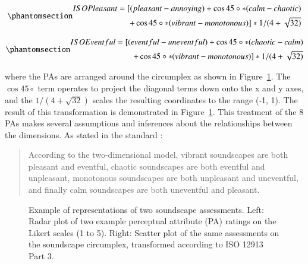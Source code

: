 \documentclass[
  authoryear,
  preprint,
  3p]{elsarticle}
\begin{document}
\begin{equation}\phantomsection\label{eq-pleasant}{
\begin{split}
    ISO Pleasant = [(pleasant - annoying) + \cos 45\circ * (calm - chaotic) \\ + \cos 45\circ * (vibrant - monotonous)] * 1/(4+\sqrt{32)}
\end{split}
}\end{equation}

\begin{equation}\phantomsection\label{eq-eventful}{
\begin{split}
    ISO Eventful = [(eventful - uneventful) + \cos 45\circ * (chaotic - calm) \\ + \cos 45\circ * (vibrant - monotonous)] * 1/(4+\sqrt{32)}
\end{split}
}\end{equation}

where the PAs are arranged around the circumplex as shown in
Figure~\ref{fig-radar}. The \(\cos 45\circ\) term operates to project
the diagonal terms down onto the x and y axes, and the
\(1 / (4 + \sqrt{32})\) scales the resulting coordinates to the range
(-1, 1). The result of this transformation is demonstrated in
Figure~\ref{fig-radar}. This treatment of the 8 PAs makes several
assumptions and inferences about the relationships between the
dimensions. As stated in the standard \citep[5]{ISO12913_3}:

\begin{quote}
According to the two-dimensional model, vibrant soundscapes are both
pleasant and eventful, chaotic soundscapes are both eventful and
unpleasant, monotonous soundscapes are both unpleasant and uneventful,
and finally calm soundscapes are both uneventful and pleasant.
\end{quote}

\begin{figure}


\caption{\label{fig-radar}Example of representations of two soundscape
assessments. Left: Radar plot of two example perceptual attribute (PA)
ratings on the Likert scales (1 to 5). Right: Scatter plot of the same
assessments on the soundscape circumplex, transformed according to ISO
12913 Part 3.}

\end{figure}%
\end{document}
